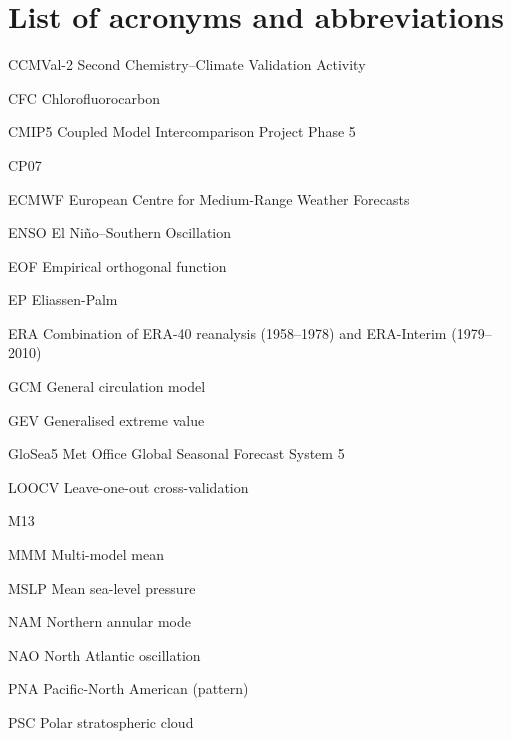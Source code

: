 \chapter*{List of acronyms and abbreviations}

\begin{description*}

\item[CCMVal-2] Second Chemistry--Climate Validation Activity 
\item[CFC] Chlorofluorocarbon
\item[CMIP5] Coupled Model Intercomparison Project Phase 5
\item[CP07] \citet{Charlton2007}
\item[ECMWF] European Centre for Medium-Range Weather Forecasts
\item[ENSO] El Ni\~no--Southern Oscillation
\item[EOF] Empirical orthogonal function
\item[EP] Eliassen-Palm
\item[ERA] Combination of ERA-40 reanalysis (1958--1978) and ERA-Interim (1979--2010)
\item[GCM] General circulation model
\item[GEV] Generalised extreme value
\item[GloSea5] Met Office Global Seasonal Forecast System 5
\item[LOOCV] Leave-one-out cross-validation
\item[M13] \citet{Mitchell2013}
\item[MMM] Multi-model mean
\item[MSLP] Mean sea-level pressure
\item[NAM] Northern annular mode
\item[NAO] North Atlantic oscillation
\item[PNA] Pacific-North American (pattern)
\item[PSC] Polar stratospheric cloud

\end{description*}
